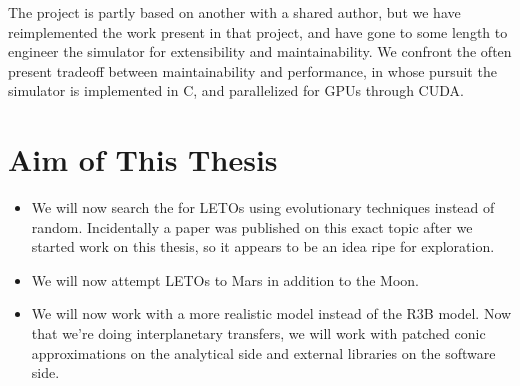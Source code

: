 The project is partly based on another with a shared author, but we have reimplemented the work present in that project, and have gone to some length to engineer the simulator for extensibility and maintainability. We confront the often present tradeoff between maintainability and performance, in whose pursuit the simulator is implemented in C, and parallelized for GPUs through CUDA. 

\section{Aim of This Thesis}
\begin{itemize}
	\item We will now search the for LETOs using evolutionary techniques instead of random. Incidentally a paper \cite{Izzo2018} was published on this exact topic after we started work on this thesis, so it appears to be an idea ripe for exploration.
	\item We will now attempt LETOs to Mars in addition to the Moon.
	\item We will now work with a more realistic model instead of the R3B model. Now that we're doing interplanetary transfers, we will work with patched conic approximations on the analytical side and external libraries on the software side.
\end{itemize}